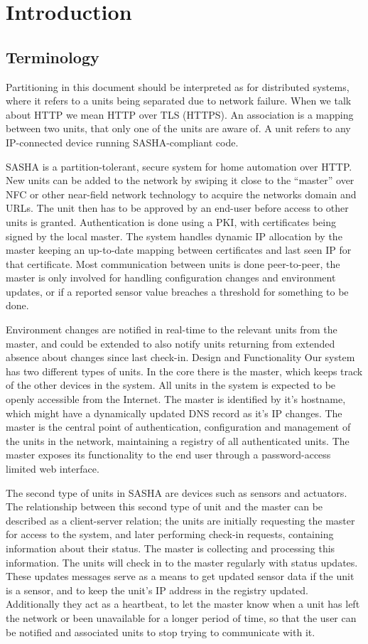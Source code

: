 \section{Introduction}


\subsection{Terminology}
Partitioning in this document should be interpreted as for distributed systems, where it refers to a units being separated due to network failure. When we talk about HTTP we mean HTTP over TLS (HTTPS). An association is a mapping between two units, that only one of the units are aware of. A unit refers to any IP-connected device running SASHA-compliant code.

SASHA is a partition-tolerant, secure system for home automation over HTTP. New units can be added to the network by swiping it close to the “master” over NFC or other near-field network technology to acquire the networks domain and URLs. The unit then has to be approved by an end-user before access to other units is granted. Authentication is done using a PKI, with certificates being signed by the local master. The system handles dynamic IP allocation by the master keeping an up-to-date mapping between certificates and last seen IP for that certificate. Most communication between units is done peer-to-peer, the master is only involved for handling configuration changes and environment updates, or if a reported sensor value breaches a threshold for something to be done.

Environment changes are notified in real-time to the relevant units from the master, and could be extended to also notify units returning from extended absence about changes since last check-in.
Design and Functionality
Our system has two different types of units. In the core there is the master, which keeps track of the other devices in the system. All units in the system is expected to be openly accessible from the Internet. The master is identified by it’s hostname, which might have a dynamically updated DNS record as it’s IP changes. The master is the central point of authentication, configuration and management of the units in the network, maintaining a registry of all authenticated units. The master exposes its functionality to the end user through a password-access limited web interface.

The second type of units in SASHA are devices such as sensors and actuators. The relationship between this second type of unit and the master can be described as a client-server relation; the units are initially requesting the master for access to the system, and later performing check-in requests, containing information about their status. The master is collecting and processing this information. The units will check in to the master regularly with status updates. These updates messages serve as a means to get updated sensor data if the unit is a sensor, and to keep the unit’s IP address in the registry updated. Additionally they act as a heartbeat, to let the master know when a unit has left the network or been unavailable for a longer period of time, so that the user can be notified and associated units to stop trying to communicate with it.

